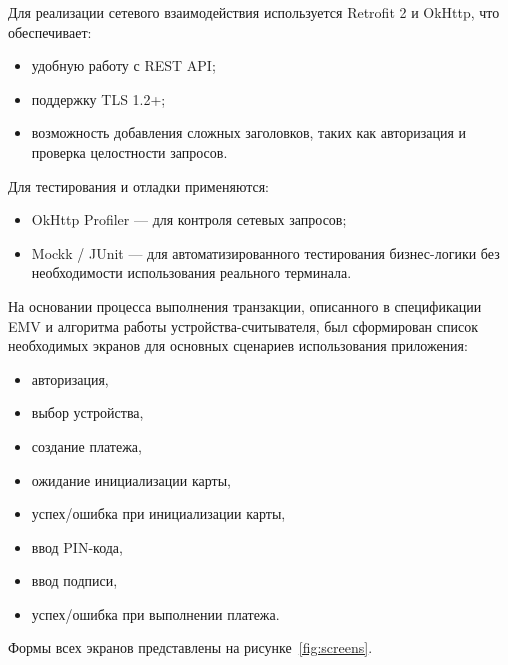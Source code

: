 Для реализации сетевого взаимодействия используется Retrofit 2 и OkHttp, что обеспечивает:

\begin{itemize}
    \item удобную работу с REST API;
    \item поддержку TLS 1.2+;
    \item возможность добавления сложных заголовков, таких как авторизация и проверка целостности запросов.
\end{itemize}

Для тестирования и отладки применяются:

\begin{itemize}
    \item OkHttp Profiler — для контроля сетевых запросов;
    \item Mockk / JUnit — для автоматизированного тестирования бизнес-логики без необходимости использования реального терминала.
\end{itemize}

На основании процесса выполнения транзакции, описанного в спецификации EMV и алгоритма работы устройства-считывателя, был сформирован список необходимых экранов для основных сценариев использования приложения:
\begin{itemize}
    \item авторизация,
    \item выбор устройства,
    \item создание платежа,
    \item ожидание инициализации карты,
    \item успех/ошибка при инициализации карты,
    \item ввод PIN-кода,
    \item ввод подписи,
    \item успех/ошибка при выполнении платежа.
\end{itemize}

Формы всех экранов представлены на рисунке~\ref{fig:screens}.

